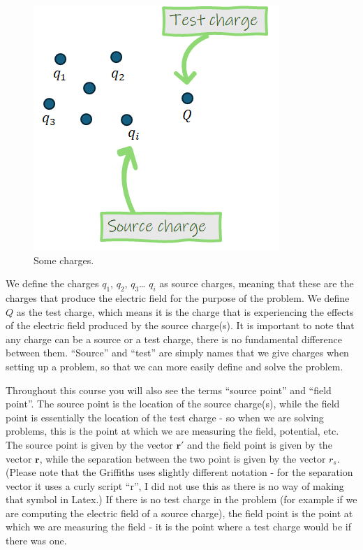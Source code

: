 \documentclass[
  letterpaper,
  DIV=11,
  numbers=noendperiod]{scrreprt}
\begin{document}
\begin{figure}[H]

{\centering \includegraphics{Figures/sourcetest_definitions.png}

}

\caption{Some charges.}

\end{figure}%

We define the charges \(q_1\), \(q_2\), \(q_3\)\ldots{} \(q_i\) as
source charges, meaning that these are the charges that produce the
electric field for the purpose of the problem. We define \(Q\) as the
test charge, which means it is the charge that is experiencing the
effects of the electric field produced by the source charge(s). It is
important to note that any charge can be a source or a test charge,
there is no fundamental difference between them. ``Source'' and ``test''
are simply names that we give charges when setting up a problem, so that
we can more easily define and solve the problem.

Throughout this course you will also see the terms ``source point'' and
``field point''. The source point is the location of the source
charge(s), while the field point is essentially the location of the test
charge - so when we are solving problems, this is the point at which we
are measuring the field, potential, etc. The source point is given by
the vector \(\mathrm{\mathbf{r}}'\) and the field point is given by the
vector \(\mathrm{\mathbf{r}}\), while the separation between the two
point is given by the vector \(r_s\). (Please note that the Griffiths
uses slightly different notation - for the separation vector it uses a
curly script ``r'', I did not use this as there is no way of making that
symbol in Latex.) If there is no test charge in the problem (for example
if we are computing the electric field of a source charge), the field
point is the point at which we are measuring the field - it is the point
where a test charge would be if there was one.
\end{document}
